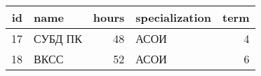 \begin{tabular}{rlrlr}
\toprule
id & name & hours & specialization & term \\
\midrule
17 & СУБД ПК & 48 & АСОИ & 4 \\
18 & ВКСС & 52 & АСОИ & 6 \\
\bottomrule
\end{tabular}
